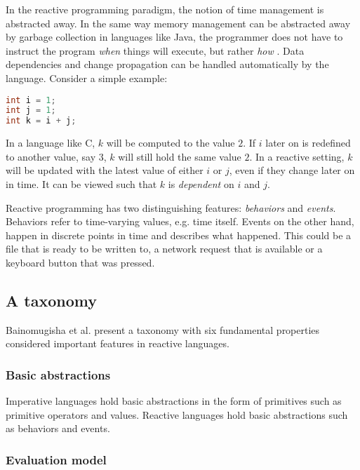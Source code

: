 In the reactive programming paradigm, the notion of time management is
abstracted away. In the same way memory management can be abstracted away by
garbage collection in languages like Java, the programmer does not have to
instruct the program \textit{when} things will execute, but rather \textit{how}
\cite{bainomugisha2013survey}.  Data dependencies and change propagation can be
handled automatically by the language. Consider a simple example:

\begin{lstlisting}[language=C]
int i = 1;
int j = 1;
int k = i + j;
\end{lstlisting}

In a language like C, $k$ will be computed to the value $2$. If $i$ later on is
redefined to another value, say $3$, $k$ will still hold the same value $2$. In
a reactive setting, $k$ will be updated with the latest value of either $i$ or
$j$, even if they change later on in time. It can be viewed such that $k$ is
\textit{dependent} on $i$ and $j$. \cite{bainomugisha2013survey}

Reactive programming has two distinguishing features: \textit{behaviors} and
\textit{events}. Behaviors refer to time-varying values, e.g. time itself.
Events on the other hand, happen in discrete points in time and describes what
happened. This could be a file that is ready to be written to, a network
request that is available or a keyboard button that was pressed.
\cite{bainomugisha2013survey}

\subsection{A taxonomy}

Bainomugisha et al. \cite{bainomugisha2013survey} present a taxonomy with six
fundamental properties considered important features in reactive languages.

\subsubsection{Basic abstractions}

Imperative languages hold basic abstractions in the form of primitives such as
primitive operators and values. Reactive languages hold basic abstractions such
as behaviors and events.

\subsubsection{Evaluation model}
\label{sec:evaluation-model}

